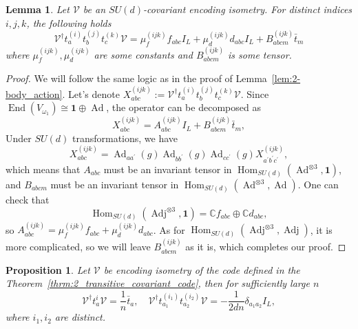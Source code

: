 \documentclass[11pt,letterpaper]{article}
\theoremstyle{plain}
\theoremstyle{plain}
\theoremstyle{plain}
\theoremstyle{plain}
\theoremstyle{plain}
\theoremstyle{plain}
\theoremstyle{plain}
\newtheorem{smproposition}[smtheorem]{Proposition}
\newtheorem{smlemma}[smtheorem]{Lemma}
\theoremstyle{definition}
\theoremstyle{plain}
\begin{document}
\begin{smlemma}\label{lem:3-body_action}
Let $\mathcal{V}$ be an $SU(d)$-covariant encoding isometry. For distinct indices $i, j, k$, the following holds
\[
    \mathcal{V}^{\dagger} t_a^{(i)} t_b^{(j)} t_c^{(k)} \mathcal{V}=\mu_{f}^{(ijk)} f_{a b c} I_L+\mu_{d}^{(ijk)} d_{a b c} I_L+B_{a b c m}^{(ijk)} \bar{t}_m
\]
where $\mu_{f}^{(ijk)}, \mu_{d}^{(ijk)}$ are some constants and $B_{a b c m}^{(ijk)}$ is some tensor.
\end{smlemma}

\begin{proof}
    We will follow the same logic as in the proof of Lemma~\ref{lem:2-body_action}. Let's denote $X_{a b c}^{(i j k)}:=\mathcal{V}^{\dagger} t_a^{(i)} t_b^{(j)} t_c^{(k)} \mathcal{V}$. Since $\operatorname{End}\left(V_{\omega_1}\right) \cong \mathbf{1} \oplus \operatorname{Ad}$,
    the operator can be decomposed as
    \[
        X_{abc}^{(i j k)}=A_{abc}^{(i j k)} I_L+B_{abcm}^{(i j k)} \bar{t}_m,
    \]
    Under $SU(d)$ transformations, we have
    \[
        X_{abc}^{(i j k)}=\operatorname{Ad}_{a a^{\prime}}(g) \operatorname{Ad}_{b b^{\prime}}(g) \operatorname{Ad}_{c c^{\prime}}(g) X_{a^{\prime} b^{\prime} c^{\prime}}^{(i j k)},
    \]
    which means that $A_{abc}$ must be an invariant tensor in $\operatorname{Hom}_{SU(d)}(\operatorname{Ad}^{\otimes 3}, \mathbf{1})$, and
    $B_{abcm}$ must be an invariant tensor in $\operatorname{Hom}_{SU(d)}(\operatorname{Ad}^{\otimes 3}, \operatorname{Ad})$.
    One can check that 
    $$
    \operatorname{Hom}_{S U(d)}\left(\operatorname{Adj}^{\otimes 3}, \mathbf{1}\right)=\mathbb{C} f_{a b c} \oplus \mathbb{C} d_{a b c},
    $$ 
    so $A_{abc}^{(i j k)}=\mu_{f}^{(ijk)} f_{a b c}+\mu_{d}^{(ijk)} d_{a b c}$. As for $\operatorname{Hom}_{SU(d)}\left(\operatorname{Adj}^{\otimes 3}, \operatorname{Adj}\right)$, it is more complicated, so we will leave $B_{abcm}^{(i j k)}$ as it is, which completes our proof.
\end{proof}

\begin{smproposition}\label{prop:1_and_2_body_action}
    Let $\mathcal{V}$ be encoding isometry of the code defined in the Theorem~\ref{thrm:2_transitive_covariant_code}, then for sufficiently large $n$
    \[
        \mathcal{V}^{\dagger}t^{i}_a \mathcal{V}=\frac{1}{n} \bar{t}_a, \quad \mathcal{V}^{\dagger} t_{a_1}^{\left(i_1\right)} t_{a_2}^{\left(i_2\right)} \mathcal{V}=-\frac{1}{2dn} \delta_{a_1 a_2} I_L,
    \]
    where $i_1, i_2$ are distinct.
\end{smproposition}
\end{document}
